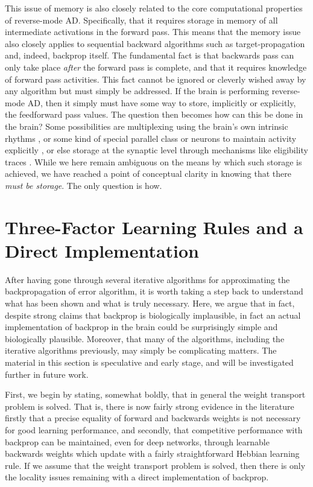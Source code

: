 This issue of memory is also closely related to the core computational properties of reverse-mode AD. Specifically, that it requires storage in memory of all intermediate activations in the forward pass. This means that the memory issue also closely applies to sequential backward algorithms such as target-propagation and, indeed, backprop itself. The fundamental fact is that backwards pass can only take place \emph{after} the forward pass is complete, and that it requires knowledge of forward pass activities. This fact cannot be ignored or cleverly wished away by any algorithm but must simply be addressed. If the brain is performing reverse-mode AD, then it simply must have some way to store, implicitly or explicitly, the feedforward pass values. The question then becomes how can this be done in the brain? Some possibilities are multiplexing using the brain's own intrinsic rhythms \citep{buzsaki2006rhythms}, or some kind of special parallel class or neurons to maintain activity explicitly \citep{o1999biologically}, or else storage at the synaptic level through mechanisms like eligibility traces \citep{bellec2020solution}. While we here remain ambiguous on the means by which such storage is achieved, we have reached a point of conceptual clarity in knowing that there \emph{must be storage}. The only question is how.

\section{Three-Factor Learning Rules and a Direct Implementation}

After having gone through several iterative algorithms for approximating the backpropagation of error algorithm, it is worth taking a step back to understand what has been shown and what is truly necessary. Here, we argue that in fact, despite strong claims that backprop is biologically implausible, in fact an actual implementation of backprop in the brain could be surprisingly simple and biologically plausible. Moreover, that many of the algorithms, including the iterative algorithms previously, may simply be complicating matters. The material in this section is speculative and early stage, and will be investigated further in future work.

First, we begin by stating, somewhat boldly, that in general the weight transport problem is solved. That is, there is now fairly strong evidence in the literature \citep{lillicrap2016random,amit2019deep,akrout2019deep,millidge2020relaxing} firstly that a precise equality of forward and backwards weights is not necessary for good learning performance, and secondly, that competitive performance with backprop can be maintained, even for deep networks, through learnable backwards weights which update with a fairly straightforward Hebbian learning rule. If we assume that the weight transport problem is solved, then there is only the locality issues remaining with a direct implementation of backprop.

